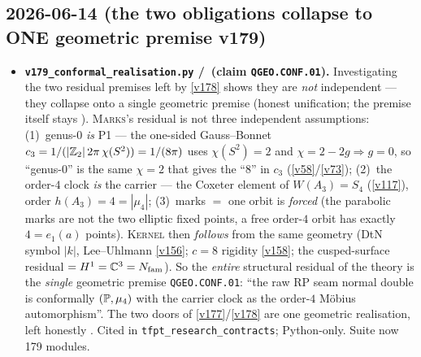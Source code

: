 \subsection*{2026-06-14 (the two obligations collapse to ONE geometric premise v179)}
\begin{itemize}
\item \textbf{\texttt{v179\_conformal\_realisation.py} \mE/\mO\ (claim \texttt{QGEO.CONF.01}).}
  Investigating the two residual premises left by \vref{v178} shows they are \emph{not} independent ---
  they collapse onto a single geometric premise (honest unification; the premise itself stays \mO).
  \textsc{Marks}'s residual is not three independent assumptions: (1)~genus-$0$ \emph{is} P1 --- the
  one-sided Gauss--Bonnet $c_3=1/(|\mathbb{Z}_2|\,2\pi\,\chi(S^2))=1/(8\pi)$ uses $\chi(S^2)=2$ and
  $\chi=2-2g\Rightarrow g=0$, so ``genus-$0$'' is the same $\chi=2$ that gives the ``$8$'' in $c_3$
  (\vref{v58}/\vref{v73}); (2)~the order-$4$ clock \emph{is} the carrier --- the Coxeter element of
  $W(A_3)=S_4$ (\vref{v117}), order $h(A_3)=4=|\mu_4|$; (3)~marks $=$ one orbit is \emph{forced} (the
  parabolic marks are not the two elliptic fixed points, a free order-$4$ orbit has exactly $4=e_1(a)$
  points). \textsc{Kernel} then \emph{follows} from the same geometry (DtN symbol $|k|$, Lee--Uhlmann
  \vref{v156}; $c=8$ rigidity \vref{v158}; the cusped-surface residual $=H^1=\mathbb C^3=N_{\mathrm{fam}}$). So
  the \emph{entire} structural residual of the theory is the \emph{single} geometric premise
  \texttt{QGEO.CONF.01}: ``the raw RP seam normal double is conformally $(\mathbb{P},\mu_4)$ with the carrier
  clock as the order-$4$ M\"obius automorphism''. The two doors of \vref{v177}/\vref{v178} are one
  geometric realisation, left honestly \mO. Cited in \texttt{tfpt\_research\_contracts}; Python-only.
  Suite now 179 modules.
\end{itemize}

